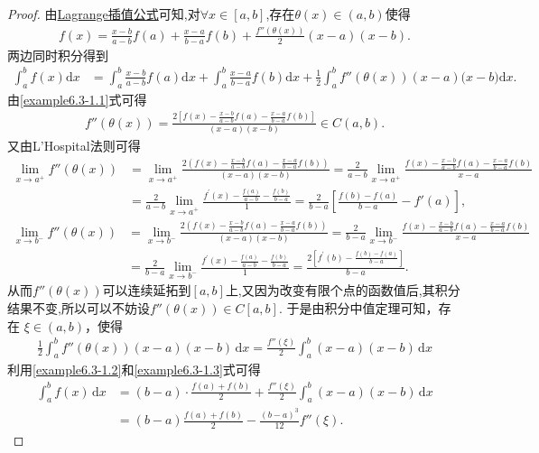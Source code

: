 \documentclass[../../main.tex]{subfiles}
\begin{document}
\begin{proof}
由\hyperref[proposition:La
grange插值公式]{Lagrange插值公式}可知,对$\forall x\in [a,b]$,存在$\theta (x)\in (a,b)$使得
\begin{align}\label{example6.3-1.1}
f(x) = \frac{x - b}{a - b} f(a) + \frac{x - a}{b - a} f(b) + \frac{f''(\theta (x))}{2} (x - a)(x - b).
\end{align}
两边同时积分得到
\begin{align}
\int_a^b{f(x)\mathrm{d}x}&=\int_a^b{\frac{x-b}{a-b}f(a)\mathrm{d}x}+\int_a^b{\frac{x-a}{b-a}f(b)\mathrm{d}x}+\frac{1}{2}\int_a^b{f'' (\theta (x) )(x-a)(x-b})\mathrm{d}x.\label{example6.3-1.2}
\end{align}
由\eqref{example6.3-1.1}式可得
\begin{align*}
f'' (\theta (x) )=\frac{2\left[ f\left( x \right) -\frac{x-b}{a-b}f(a)-\frac{x-a}{b-a}f\left( b \right) \right]}{(x-a)(x-b)}\in C\left( a,b \right) .
\end{align*}
又由L'Hospital法则可得
\begin{align*}
\underset{x\rightarrow a^+}{\lim}f'' \left( \theta \left( x \right) \right) &=\underset{x\rightarrow a^+}{\lim}\frac{2\left( f\left( x \right) -\frac{x-b}{a-b}f(a)-\frac{x-a}{b-a}f\left( b \right) \right)}{(x-a)(x-b)}=\frac{2}{a-b}\underset{x\rightarrow a^+}{\lim}\frac{f\left( x \right) -\frac{x-b}{a-b}f(a)-\frac{x-a}{b-a}f\left( b \right)}{x-a}
\\
&=\frac{2}{a-b}\lim_{x\rightarrow a^+} \frac{f^{\prime}(x)-\frac{f(a)}{a-b}-\frac{f(b)}{b-a}}{1}=\frac{2}{b-a}\left[ \frac{f\left( b \right) -f\left( a \right)}{b-a}-f\prime \left( a \right) \right] ,   
\end{align*}
\begin{align*}
\underset{x\rightarrow b^-}{\lim}f'' \left( \theta \left( x \right) \right) &=\underset{x\rightarrow b^-}{\lim}\frac{2\left( f(x)-\frac{x-b}{a-b}f(a)-\frac{x-a}{b-a}f(b) \right)}{(x-a)(x-b)}=\frac{2}{b-a}\underset{x\rightarrow b^-}{\lim}\frac{f\left( x \right) -\frac{x-b}{a-b}f(a)-\frac{x-a}{b-a}f\left( b \right)}{x-a}
\\
&=\frac{2}{b-a}\lim_{x\rightarrow b^-} \frac{f^{\prime}(x)-\frac{f(a)}{a-b}-\frac{f(b)}{b-a}}{1}=\frac{2\left[ f^{\prime}(b)-\frac{f(b)-f(a)}{b-a} \right]}{b-a}.   
\end{align*}
从而$f'' \left( \theta \left( x \right) \right)$可以连续延拓到$[a,b]$上,又因为改变有限个点的函数值后,其积分结果不变,所以可以不妨设$f''(\theta(x))\in C[a,b]$.
于是由积分中值定理可知，存在 $\xi \in (a, b)$，使得
\begin{align}
\frac{1}{2} \int_a^b f''(\theta (x)) (x-a)(x-b) \, \mathrm{d}x = \frac{f''(\xi)}{2} \int_a^b (x-a)(x-b) \, \mathrm{d}x \label{example6.3-1.3}
\end{align}
利用\eqref{example6.3-1.2}和\eqref{example6.3-1.3}式可得
\begin{align*}
\int_a^b f(x) \, \mathrm{d}x &= (b-a) \cdot \frac{f(a) + f(b)}{2} + \frac{f''(\xi)}{2} \int_a^b (x-a)(x-b) \, \mathrm{d}x \\
&= (b-a) \frac{f(a) + f(b)}{2} - \frac{(b-a)^3}{12} f''(\xi). 
\end{align*}
\end{proof}
\end{document}

